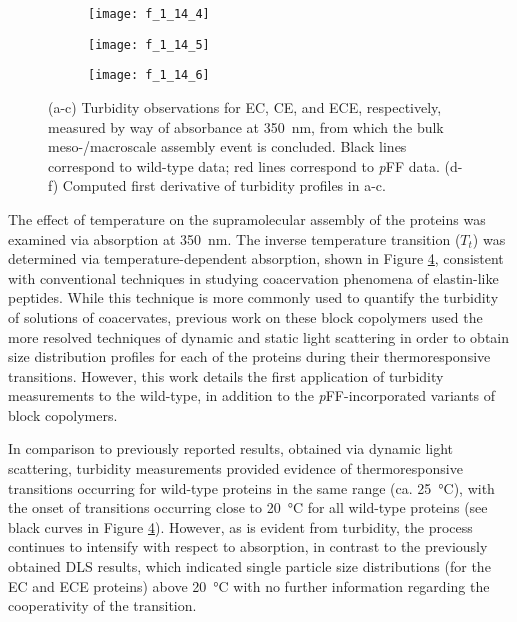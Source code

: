\begin{refsection}
\begin{figure}[h!]
    \begin{subfigure}[b]{0.32\textwidth}
        \texttt{[image: f\_1\_14\_4]}
        \caption{}
        \label{fig:LCST_deriv_ECpFF}
    \end{subfigure}
    \begin{subfigure}[b]{0.32\textwidth}
        \texttt{[image: f\_1\_14\_5]}
        \caption{}
        \label{fig:LCST_deriv_CEpFF}
    \end{subfigure}
    \begin{subfigure}[b]{0.32\textwidth}
        \texttt{[image: f\_1\_14\_6]}
        \caption{}
        \label{fig:LCST_deriv_ECEpFF}
    \end{subfigure}
    \caption{(a-c) Turbidity observations for EC, CE, and ECE, respectively,
        measured by way of absorbance at \SI{350}{\nm}, from which the bulk
        meso-/macroscale assembly event is concluded. Black lines
        correspond to wild-type data; red lines correspond to \emph{p}FF data. (d-f)
    Computed first derivative of turbidity profiles in a-c.}
    \label{fig:lcst}
\end{figure}
The effect of temperature on the supramolecular assembly of the proteins was
examined via absorption at \SI{350}{\nm}. The inverse temperature transition
(${T_t}$) was determined via temperature-dependent absorption, shown in Figure
\ref{fig:lcst}, consistent with conventional techniques in studying coacervation
phenomena of elastin-like peptides.\cite{Urry1985} While this technique is more
commonly used to quantify the turbidity of solutions of coacervates, previous
work on these block copolymers used the more resolved techniques of dynamic and
static light scattering in order to obtain size distribution profiles for each
of the proteins during their thermoresponsive transitions. However, this work
details the first application of turbidity measurements to the
wild-type, in addition to the \emph{p}FF-incorporated variants of block copolymers.

In comparison to previously reported results, obtained via dynamic light
scattering, turbidity measurements provided evidence of thermoresponsive
transitions occurring for wild-type proteins in the same range (ca.
\SI{25}{\celsius}), with the onset of transitions occurring close to
\SI{20}{\celsius} for all wild-type proteins (see black curves in Figure 
\ref{fig:lcst}). However, as is evident from turbidity, the process continues
to intensify with respect to absorption, in contrast to the previously obtained
DLS results, which indicated single particle size distributions (for the EC and
ECE proteins) above \SI{20}{\celsius} with no further information regarding the
cooperativity of the transition.


\end{refsection}
